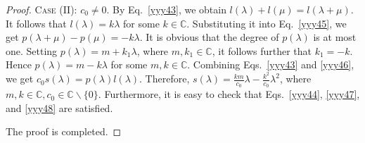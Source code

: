 \documentclass[11pt,letterpaper,reqno]{amsart}
\theoremstyle{definition}
\numberwithin{equation}{section}
\begin{document}
\begin{proof}
C\textsc{ase} (II): $c_{0}\neq0$. By Eq.~\eqref{yyy43}, we obtain $l(\lambda)+l(\mu)=l(\lambda+\mu)$. It follows that $l(\lambda)=k\lambda$ for some $k\in \mathbb{C}$.
Substituting it into Eq.~\eqref{yyy45}, we get $p(\lambda+\mu)-p(\mu)=-k\lambda$.
It is obvious that the degree of $p(\lambda)$ is at most one. Setting $p(\lambda)=m+k_1\lambda$, where $m,k_1\in \mathbb{C}$,
it follows further that $k_1=-k$. Hence $p(\lambda)=m-k\lambda$ for some $m,k\in \mathbb{C}$. %
Combining Eqs.~\eqref{yyy43} and \eqref{yyy46}, we get $c_0s(\lambda)=p(\lambda)l(\lambda)$. Therefore, $s(\lambda)=\frac{km}{c_0}\lambda-\frac{k^2}{c_0}\lambda^2$, where $m,k\in \mathbb{C},c_0\in\mathbb{C}\backslash\{0\}$.
Furthermore, it is easy to check that Eqs.~\eqref{yyy44}, \eqref{yyy47}, and \eqref{yyy48} are satisfied.

The proof is completed.
\end{proof}
\end{document}

